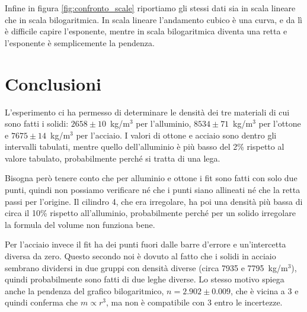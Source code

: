 \documentclass[a4paper]{article}
\begin{document}
Infine in figura \ref{fig:confronto_scale} riportiamo gli stessi dati sia in scala lineare che in scala bilogaritmica. In scala lineare l'andamento cubico è una curva, e da lì è difficile capire l'esponente, mentre in scala bilogaritmica diventa una retta e l'esponente è semplicemente la pendenza.

\section{Conclusioni}

L'esperimento ci ha permesso di determinare le densità dei tre materiali di cui sono fatti i solidi: $2658 \pm 10$~kg/m$^3$ per l'alluminio, $8534 \pm 71$~kg/m$^3$ per l'ottone e $7675 \pm 14$~kg/m$^3$ per l'acciaio. I valori di ottone e acciaio sono dentro gli intervalli tabulati, mentre quello dell'alluminio è più basso del 2\% rispetto al valore tabulato, probabilmente perché si tratta di una lega.

Bisogna però tenere conto che per alluminio e ottone i fit sono fatti con solo due punti, quindi non possiamo verificare né che i punti siano allineati né che la retta passi per l'origine. Il cilindro 4, che era irregolare, ha poi una densità più bassa di circa il 10\% rispetto all'alluminio, probabilmente perché per un solido irregolare la formula del volume non funziona bene.

Per l'acciaio invece il fit ha dei punti fuori dalle barre d'errore e un'intercetta diversa da zero. Questo secondo noi è dovuto al fatto che i solidi in acciaio sembrano dividersi in due gruppi con densità diverse (circa 7935 e 7795~kg/m$^3$), quindi probabilmente sono fatti di due leghe diverse. Lo stesso motivo spiega anche la pendenza del grafico bilogaritmico, $n = 2.902 \pm 0.009$, che è vicina a 3 e quindi conferma che $m \propto r^3$, ma non è compatibile con 3 entro le incertezze.
\end{document}
